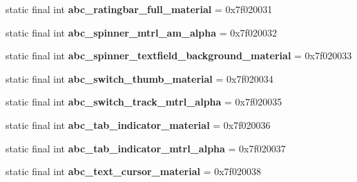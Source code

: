 \begin{DoxyCompactItemize}
\item 
\hypertarget{classandroid_1_1support_1_1design_1_1_r_1_1drawable_add33276caf8e7b91dcbfc5a1b11f60a4}{}static final int {\bfseries abc\+\_\+ratingbar\+\_\+full\+\_\+material} = 0x7f020031\label{classandroid_1_1support_1_1design_1_1_r_1_1drawable_add33276caf8e7b91dcbfc5a1b11f60a4}

\item 
\hypertarget{classandroid_1_1support_1_1design_1_1_r_1_1drawable_ab4ab615c21373d1dce94cb8dd6e3cbe3}{}static final int {\bfseries abc\+\_\+spinner\+\_\+mtrl\+\_\+am\+\_\+alpha} = 0x7f020032\label{classandroid_1_1support_1_1design_1_1_r_1_1drawable_ab4ab615c21373d1dce94cb8dd6e3cbe3}

\item 
\hypertarget{classandroid_1_1support_1_1design_1_1_r_1_1drawable_a46a7523b2bf448075a84dea597735916}{}static final int {\bfseries abc\+\_\+spinner\+\_\+textfield\+\_\+background\+\_\+material} = 0x7f020033\label{classandroid_1_1support_1_1design_1_1_r_1_1drawable_a46a7523b2bf448075a84dea597735916}

\item 
\hypertarget{classandroid_1_1support_1_1design_1_1_r_1_1drawable_a3a7eda576b66b008b9973477103ad769}{}static final int {\bfseries abc\+\_\+switch\+\_\+thumb\+\_\+material} = 0x7f020034\label{classandroid_1_1support_1_1design_1_1_r_1_1drawable_a3a7eda576b66b008b9973477103ad769}

\item 
\hypertarget{classandroid_1_1support_1_1design_1_1_r_1_1drawable_a2c00fcab8bac6c66dbe2d1a34992f941}{}static final int {\bfseries abc\+\_\+switch\+\_\+track\+\_\+mtrl\+\_\+alpha} = 0x7f020035\label{classandroid_1_1support_1_1design_1_1_r_1_1drawable_a2c00fcab8bac6c66dbe2d1a34992f941}

\item 
\hypertarget{classandroid_1_1support_1_1design_1_1_r_1_1drawable_a1df6dff38e80904864f9d1b16188e4b0}{}static final int {\bfseries abc\+\_\+tab\+\_\+indicator\+\_\+material} = 0x7f020036\label{classandroid_1_1support_1_1design_1_1_r_1_1drawable_a1df6dff38e80904864f9d1b16188e4b0}

\item 
\hypertarget{classandroid_1_1support_1_1design_1_1_r_1_1drawable_a7e95b663c60c56e55380a5750cbaf5e3}{}static final int {\bfseries abc\+\_\+tab\+\_\+indicator\+\_\+mtrl\+\_\+alpha} = 0x7f020037\label{classandroid_1_1support_1_1design_1_1_r_1_1drawable_a7e95b663c60c56e55380a5750cbaf5e3}

\item 
\hypertarget{classandroid_1_1support_1_1design_1_1_r_1_1drawable_ab7d0879432ccba232192251a071145bc}{}static final int {\bfseries abc\+\_\+text\+\_\+cursor\+\_\+material} = 0x7f020038\label{classandroid_1_1support_1_1design_1_1_r_1_1drawable_ab7d0879432ccba232192251a071145bc}


\end{DoxyCompactItemize}
